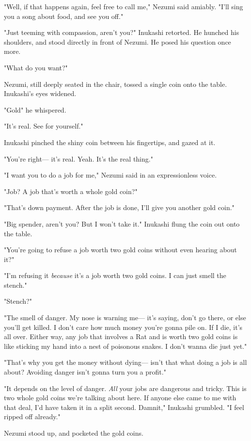 "Well, if that happens again, feel free to call me," Nezumi said
amiably. "I'll sing you a song about food, and see you off."

"Just teeming with compassion, aren't you?" Inukashi retorted. He
hunched his shoulders, and stood directly in front of Nezumi. He posed
his question once more.

"What do you want?"

Nezumi, still deeply seated in the chair, tossed a single coin onto the
table. Inukashi's eyes widened.

"Gold\el " he whispered.

"It's real. See for yourself."

Inukashi pinched the shiny coin between his fingertips, and gazed at it.

"You're right--- it's real. Yeah. It's the real thing."

"I want you to do a job for me," Nezumi said in an expressionless voice.

"Job? A job that's worth a whole gold coin?"

"That's down payment. After the job is done, I'll give you another gold
coin."

"Big spender, aren't you? But I won't take it." Inukashi flung the coin
out onto the table.

"You're going to refuse a job worth two gold coins without even hearing
about it?"

"I'm refusing it \emph{because} it's a job worth two gold coins. I can just
smell the stench."

"Stench?"

"The smell of danger. My nose is warning me--- it's saying, don't go
there, or else you'll get killed. I don't care how much money you're
gonna pile on. If I die, it's all over. Either way, any job that
involves a Rat and is worth two gold coins is like sticking my hand into
a nest of poisonous snakes. I don't wanna die just yet."

"That's why you get the money without dying--- isn't that what doing a job
is all about? Avoiding danger isn't gonna turn you a profit."

"It depends on the level of danger. \emph{All} your jobs are dangerous and
tricky. This is two whole gold coins we're talking about here. If anyone
else came to me with that deal, I'd have taken it in a split second.
Damnit," Inukashi grumbled. "I feel ripped off already."

Nezumi stood up, and pocketed the gold coins.

